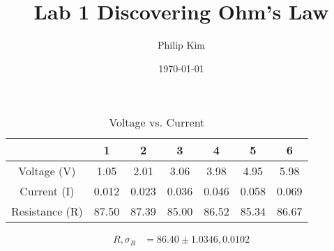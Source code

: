 \documentclass[a4paper]{article}
\title{Lab 1 Discovering Ohm's Law}
\author{Philip Kim}
\date{\today}
\begin{document}
\maketitle

\begin{table}[h!]
  \begin{center}
    \caption{Voltage vs. Current}\label{tab:table1}
    \begin{tabular}{|c|c|c|c|c|c|c|}\hline
      & 1 & 2 & 3 & 4 & 5 & 6 \\ \hline
      Voltage (V) & 1.05 & 2.01 & 3.06 & 3.98 & 4.95 & 5.98 \\ \hline
      Current (I) & 0.012 & 0.023 & 0.036 & 0.046 & 0.058 & 0.069 \\ \hline
      Resistance (R) & 87.50 & 87.39 & 85.00 & 86.52 & 85.34 & 86.67 \\ \hline
    \end{tabular}
  \end{center}
  \begin{center}
    \begin{equation}
      \begin{split}
        R, \sigma_R &= \boxed{86.40 \pm 1.0346,0.0102}
      \end{split}
    \end{equation}
  \end{center}
\end{table}
\end{document}
